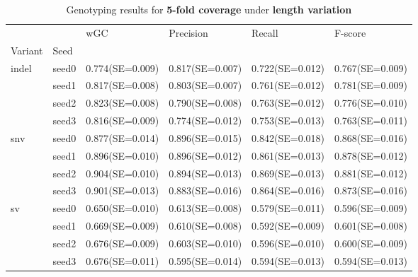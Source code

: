 \documentclass{PHlab-thesis}
\begin{document}
\begin{table}[ht!]
\begin{tabular*}{\textwidth}{@{\extracolsep{\fill}}llllll@{\extracolsep{\fill}}}
\toprule
   &         &               wGC &         Precision &            Recall &           F-score \\
Variant & Seed &                   &                   &                   &                   \\
\midrule
indel & seed0  & 0.774(SE=0.009)& 0.817(SE=0.007)& 0.722(SE=0.012)& 0.767(SE=0.009) \\
   & seed1 & 0.817(SE=0.008)&  0.803(SE=0.007)&  0.761(SE=0.012)&  0.781(SE=0.009)\\
   & seed2 & 0.823(SE=0.008)& 0.790(SE=0.008)& 0.763(SE=0.012)& 0.776(SE=0.010)\\
   & seed3 &  0.816(SE=0.009)&  0.774(SE=0.012)&  0.753(SE=0.013)&  0.763(SE=0.011)\\
\midrule
snv & seed0  & 0.877(SE=0.014)& 0.896(SE=0.015)& 0.842(SE=0.018)& 0.868(SE=0.016) \\
   & seed1 &0.896(SE=0.010)&  0.896(SE=0.012)&  0.861(SE=0.013)&  0.878(SE=0.012)\\
   & seed2 & 0.904(SE=0.010)& 0.894(SE=0.013)& 0.869(SE=0.013)& 0.881(SE=0.012)\\
   & seed3 & 0.901(SE=0.013)&  0.883(SE=0.016)&  0.864(SE=0.016)&  0.873(SE=0.016)\\
\midrule
sv & seed0  & 0.650(SE=0.010)& 0.613(SE=0.008)& 0.579(SE=0.011)& 0.596(SE=0.009) \\
   & seed1 & 0.669(SE=0.009)&  0.610(SE=0.008)&  0.592(SE=0.009)&  0.601(SE=0.008)\\
   & seed2 & 0.676(SE=0.009)&0.603(SE=0.010)&0.596(SE=0.010)&0.600(SE=0.009)\\
   & seed3 & 0.676(SE=0.011)&  0.595(SE=0.014)&  0.594(SE=0.013)&  0.594(SE=0.013)\\
\bottomrule
\end{tabular*}
\caption{Genotyping results for \textbf{5-fold coverage} under \textbf{length variation} \label{table:len-5x}}
\end{table}
\end{document}

